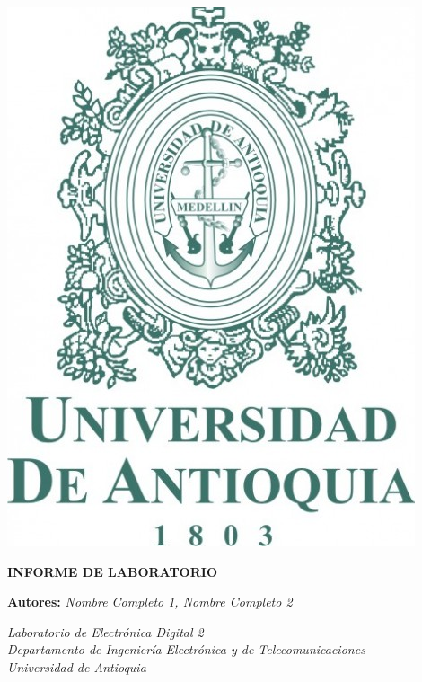 \onecolumn\begin{@twocolumntrue}
    \begin{minipage}{0.15\textwidth}
    {
        \includegraphics[scale=0.20]{images/UdeA.jpg}
    } 
    \end{minipage}
    \vspace{10pt}
    \begin{minipage}{0.75\textwidth}
        \begin{center}
            \vspace{2mm}
        
            \Large{\textbf{INFORME DE LABORATORIO}}
            \vspace{2mm}

            \large{\textbf{Autores: }\textit{Nombre Completo 1, Nombre Completo 2}} 
            \vspace{2mm}
    
            \small{\textit{Laboratorio de Electrónica Digital 2 \\
            Departamento de Ingeniería Electrónica y de Telecomunicaciones \\ Universidad de Antioquia}}
            \vspace{2mm}

            \footnotesize   
        \end{center}
    \end{minipage}
\end{@twocolumntrue}